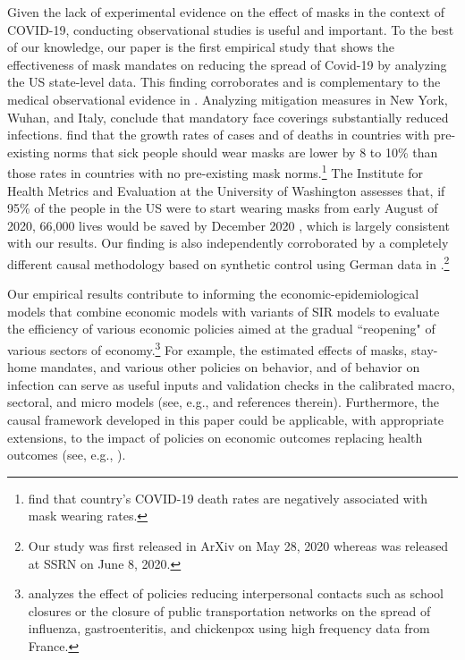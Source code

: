 \documentclass[11pt,reqno,letter]{amsart}
\theoremstyle{definition}
\begin{document}
Given the lack of experimental evidence on the effect of masks in the context of COVID-19, conducting observational studies  is useful and important. To the best of our knowledge, our paper is the first  empirical study that shows the effectiveness of  mask mandates on reducing the spread of Covid-19 by analyzing the US state-level data. This finding corroborates and is complementary to the medical observational evidence in \cite{howard2020}. Analyzing mitigation measures in New York, Wuhan, and Italy, \cite{zhangr2020} conclude that mandatory face coverings substantially reduced infections. \cite{abaluck2020}  find that the growth rates of cases and of deaths in countries with pre-existing norms that sick people should wear masks are lower by 8 to 10\% than those rates in countries with no pre-existing mask norms.\footnote{\cite{miyazawa2020} find that  country's COVID-19 death rates are negatively associated with mask wearing rates.} The Institute for Health Metrics and Evaluation at the University of Washington  assesses that, if 95\% of the people in the US were to start wearing masks from early August of 2020, 66,000 lives would be saved by December 2020 \citep{IHME2020}, which is largely consistent with our results.
Our finding is also independently corroborated by a completely different causal methodology based on synthetic control
using German data in \cite{Mitze2020}.\footnote{Our study was first released in ArXiv on May 28, 2020 whereas
 \cite{Mitze2020} was released at SSRN on June 8, 2020. }

Our empirical results contribute to informing the economic-epidemiological models that combine economic models with variants of SIR models to evaluate the efficiency of various economic policies aimed at  the gradual ``reopening" of various sectors of economy.\footnote{\cite{adda2016} analyzes the effect of policies reducing interpersonal contacts such as school closures or the closure of public transportation networks on the spread of  influenza, gastroenteritis, and chickenpox using high frequency data from France.} For example, the estimated effects of masks, stay-home mandates, and various other policies on behavior, and of behavior on infection can serve as useful inputs and validation checks in the calibrated macro, sectoral, and micro models (see, e.g., \cite{alvarez2020simple,baqaee2020reopening,NBERw27128,acemoglu2020multi,lsmith,nashSIR} and references therein). Furthermore, the causal framework developed in this paper could be applicable, with appropriate extensions, to the impact of policies on economic outcomes replacing health outcomes (see, e.g., \cite{chetty2020real,coibion2020labor}).
\end{document}
